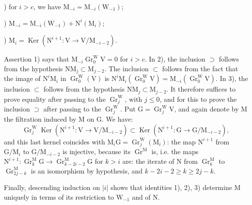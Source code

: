 \documentclass[11pt,leqno]{article}
\begin{document}
) for \(i>c\), we have \(\mathrm{M}_{-i}=\mathrm{M}_{-i}(\mathrm{W}_{-1})\);

) \(\mathrm{M}_{-i}=\mathrm{M}_{-i}(\mathrm{W}_{-1})+\mathrm{N}^i(\mathrm{M}_i)\);

) \(\mathrm{M}_i=\operatorname{Ker}(\mathrm{N}^{i+1}:\mathrm{V}\to\mathrm{V}/\mathrm{M}_{-i-2})\).

\noindent Assertion 1) says that \(\mathrm{M}_{-i}\operatorname{Gr}_0^{\mathrm{W}}\mathrm{V}=0\) for \(i>c\). In 2), the inclusion \(\supset\) follows from the hypothesis \(\mathrm{N}\mathrm{M}_j\subset\mathrm{M}_{j-2}\). The inclusion \(\subset\) follows from the fact that the image of \(\mathrm{N}^i\mathrm{M}_i\) in \(\operatorname{Gr}_0^{\mathrm{W}}(\mathrm{V})\) is \(\mathrm{N}^i\mathrm{M}_i(\operatorname{Gr}_0^{\mathrm{W}}\mathrm{V})=\mathrm{M}_{-i}(\operatorname{Gr}_0^{\mathrm{W}}\mathrm{V})\). In 3), the inclusion \(\subset\) follows from the hypothesis \(\mathrm{N}\mathrm{M}_j\subset\mathrm{M}_{j-2}\). It therefore suffices to prove equality after passing to the \(\operatorname{Gr}_j^{\mathrm{W}}\), with \(j\leq0\), and for this to prove the inclusion \(\supset\) after passing to the \(\operatorname{Gr}_j^{\mathrm{W}}\). Put \(\mathrm{G}=\operatorname{Gr}_j^{\mathrm{W}}\mathrm{V}\), and again denote by \(\mathrm{M}\) the filtration induced by \(\mathrm{M}\) on \(\mathrm{G}\). We have:
\[
\operatorname{Gr}_j^{\mathrm{W}}\operatorname{Ker}
(\mathrm{N}^{i+1}:\mathrm{V}\to\mathrm{V}/\mathrm{M}_{-i-2})
\subset
\operatorname{Ker}
(\mathrm{N}^{i+1}:\mathrm{G}\to\mathrm{G}/\mathrm{M}_{-i-2}),
\]
and this last kernel coincides with \(\mathrm{M}_i\mathrm{G}=\operatorname{Gr}_j^{\mathrm{W}}(\mathrm{M}_i)\): the map \(\mathrm{N}^{i+1}\) from \(\mathrm{G}/\mathrm{M}_i\) to \(\mathrm{G}/\mathrm{M}_{-i-2}\) is injective, because its \(\operatorname{Gr}^{\mathrm{M}}\) is, i.e. the maps \(\mathrm{N}^{i+1}:\operatorname{Gr}_k^{\mathrm{M}}\mathrm{G}\to\operatorname{Gr}_{k-2i-2}^{\mathrm{M}}\mathrm{G}\) for \(k>i\) are: the iterate of \(\mathrm{N}\) from \(\operatorname{Gr}_k^{\mathrm{M}}\) to \(\operatorname{Gr}_{2j-k}^{\mathrm{M}}\) is an isomorphism by hypothesis, and \(k-2i-2\geq k\geq2j-k\).

Finally, descending induction on \(|i|\) shows that identities 1), 2), 3) determine \(\mathrm{M}\) uniquely in terms of its restriction to \(\mathrm{W}_{-1}\) and of \(\mathrm{N}\).
\end{document}
